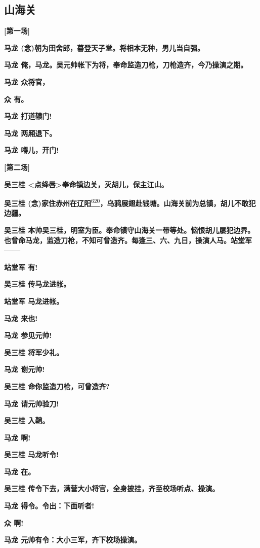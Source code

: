 \newpage
\hypertarget{ux5c71ux6d77ux5173}{%
\subsection{山海关}\label{ux5c71ux6d77ux5173}}

\textbf{{[}第一场{]}}

\textbf{马龙 (念)朝为田舍郎，暮登天子堂。将相本无种，男儿当自强。}

\textbf{马龙
俺，马龙。吴元帅帐下为将，奉命监造刀枪，刀枪造齐，今乃操演之期。}

\textbf{马龙 众将官，}

\textbf{众 有。}

\textbf{马龙 打道辕门!}

\textbf{马龙 两厢退下。}

\textbf{马龙 嘚儿，开门!}

\textbf{{[}第二场{]}}

\textbf{吴三桂
\textless{}点绛唇\textgreater{}奉命镇边关，灭胡儿，保主江山。}

\textbf{吴三桂
(念)家住赤州在辽阳}\protect\hyperlink{fn620}{\textsuperscript{620}}\textbf{，乌鸦展翅赴钱塘。山海关前为总镇，胡儿不敢犯边疆。}

\textbf{吴三桂
本帅吴三桂，明室为臣。奉命镇守山海关一带等处。恼恨胡儿屡犯边界。也曾命马龙，监造刀枪，不知可曾造齐。每逢三、六、九日，操演人马。站堂军------}

\textbf{站堂军 有!}

\textbf{吴三桂 传马龙进帐。}

\textbf{站堂军 马龙进帐。}

\textbf{马龙 来也!}

\textbf{马龙 参见元帅!}

\textbf{吴三桂 将军少礼。}

\textbf{马龙 谢元帅!}

\textbf{吴三桂 命你监造刀枪，可曾造齐?}

\textbf{马龙 请元帅验刀!}

\textbf{吴三桂 入鞘。}

\textbf{马龙 啊!}

\textbf{吴三桂 马龙听令!}

\textbf{马龙 在。}

\textbf{吴三桂 传令下去，满营大小将官，全身披挂，齐至校场听点、操演。}

\textbf{马龙 得令。令出：下面听者!}

\textbf{众 啊!}

\textbf{马龙 元帅有令：大小三军，齐下校场操演。}

